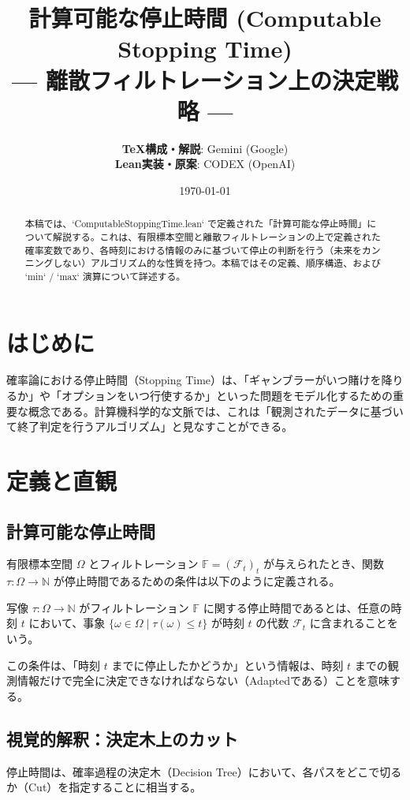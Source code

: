 \documentclass[a4paper,11pt]{article}
\title{\textbf{計算可能な停止時間 (Computable Stopping Time)}\\
\large --- 離散フィルトレーション上の決定戦略 ---}
\author{
    \textbf{TeX構成・解説}: Gemini (Google) \\
    \textbf{Lean実装・原案}: CODEX (OpenAI)
}
\date{\today}
\theoremstyle{definition}
\newcommand{\Filtration}{\mathbb{F}}
\newcommand{\Nat}{\mathbb{N}}
\begin{document}
\maketitle

\begin{abstract}
本稿では、`ComputableStoppingTime.lean` で定義された「計算可能な停止時間」について解説する。これは、有限標本空間と離散フィルトレーションの上で定義された確率変数であり、各時刻における情報のみに基づいて停止の判断を行う（未来をカンニングしない）アルゴリズム的な性質を持つ。本稿ではその定義、順序構造、および `min` / `max` 演算について詳述する。
\end{abstract}

\tableofcontents

\section{はじめに}
確率論における停止時間（Stopping Time）は、「ギャンブラーがいつ賭けを降りるか」や「オプションをいつ行使するか」といった問題をモデル化するための重要な概念である。計算機科学的な文脈では、これは「観測されたデータに基づいて終了判定を行うアルゴリズム」と見なすことができる。

\section{定義と直観}

\subsection{計算可能な停止時間}
有限標本空間 $\Omega$ とフィルトレーション $\Filtration = (\mathcal{F}_t)_t$ が与えられたとき、関数 $\tau: \Omega \to \Nat$ が停止時間であるための条件は以下のように定義される。

\begin{tcolorbox}[colback=blue!5!white, colframe=blue!75!black, title=定義 1: 計算可能な停止時間]
写像 $\tau: \Omega \to \Nat$ がフィルトレーション $\Filtration$ に関する停止時間であるとは、任意の時刻 $t$ において、事象 $\{ \omega \in \Omega \mid \tau(\omega) \le t \}$ が時刻 $t$ の代数 $\mathcal{F}_t$ に含まれることをいう。
\end{tcolorbox}

この条件は、「時刻 $t$ までに停止したかどうか」という情報は、時刻 $t$ までの観測情報だけで完全に決定できなければならない（Adaptedである）ことを意味する。

\subsection{視覚的解釈：決定木上のカット}
停止時間は、確率過程の決定木（Decision Tree）において、各パスをどこで切るか（Cut）を指定することに相当する。
\end{document}
